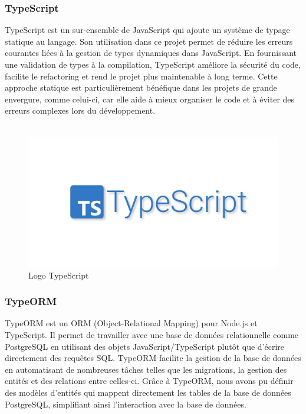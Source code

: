 {\subsubsection*{TypeScript}
TypeScript est un sur-ensemble de JavaScript qui ajoute un système de typage statique au langage. Son utilisation dans ce projet permet de réduire les erreurs courantes liées à la gestion de types dynamiques dans JavaScript. En fournissant une validation de types à la compilation, TypeScript améliore la sécurité du code, facilite le refactoring et rend le projet plus maintenable à long terme. Cette approche statique est particulièrement bénéfique dans les projets de grande envergure, comme celui-ci, car elle aide à mieux organiser le code et à éviter des erreurs complexes lors du développement.\\\\

\begin{figure}[H]
\begin{center}
\includegraphics[width=15.5cm]{assets/presentation/TypeScript.jpg}
\end{center}
\caption{Logo TypeScript}
\end{figure}

\subsubsection*{TypeORM}
TypeORM est un ORM (Object-Relational Mapping) pour Node.js et TypeScript. Il permet de travailler avec une base de données relationnelle comme PostgreSQL en utilisant des objets JavaScript/TypeScript plutôt que d'écrire directement des requêtes SQL. TypeORM facilite la gestion de la base de données en automatisant de nombreuses tâches telles que les migrations, la gestion des entités et des relations entre celles-ci. Grâce à TypeORM, nous avons pu définir des modèles d'entités qui mappent directement les tables de la base de données PostgreSQL, simplifiant ainsi l'interaction avec la base de données.\\\\

}
